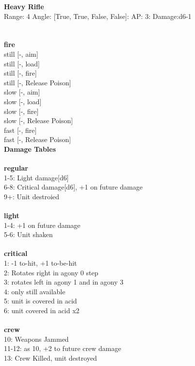 {\bf Heavy Rifle } \\



Range: 4  Angle: [True, True, False, False]: AP: 3: Damage:d6-1 \\




 
\ \\



\ \\ {\bf fire } \\
still [-, aim] \\
still [-, load] \\
still [-, fire] \\
still [-, Release Poison] \\
slow [-, aim] \\
slow [-, load] \\
slow [-, fire] \\
slow [-, Release Poison] \\
fast [-, fire] \\
fast [-, Release Poison] \\


{\bf Damage Tables} \\
\ \\ {\bf regular } \\
1-5: Light damage[d6] \\
6-8: Critical damage[d6], +1 on future damage \\
9+: Unit destroied \\
\ \\ {\bf light } \\
1-4: +1 on future damage \\
5-6: Unit shaken \\
\ \\ {\bf critical } \\
1: -1 to-hit, +1 to-be-hit \\
2: Rotates right in agony 0 step \\
3: rotates left in agony 1 and in agony 3 \\
4: only still available \\
5: unit is covered in acid \\
6: unit covered in acid x2 \\
\ \\ {\bf crew } \\
10: Weapons Jammed \\
11-12: as 10, +2 to future crew damage \\
13: Crew Killed, unit destroyed \\










